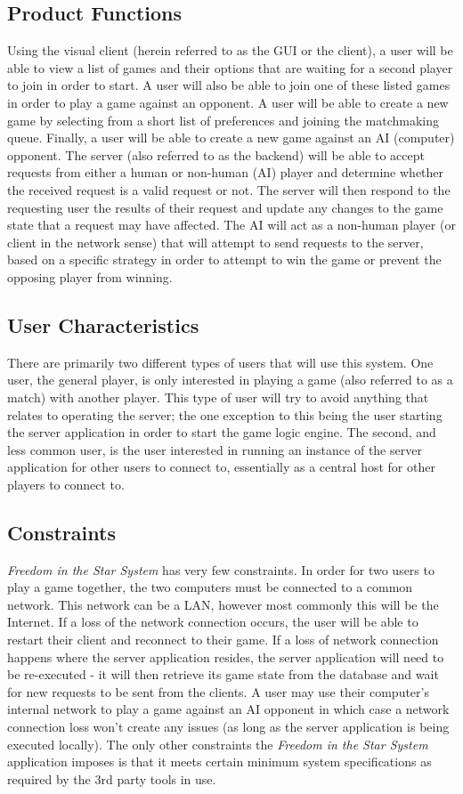 \documentclass[twoside,letterpaper]{article}
\begin{document}
\subsection{Product Functions}
Using the visual client (herein referred to as the GUI or the client), a user will be able to view a list of games and their options that are waiting for a second player to join in order to start.  A user will also be able to join one of these listed games in order to play a game against an opponent.  A user will be able to create a new game by selecting from a short list of preferences and joining the matchmaking queue.  Finally, a user will be able to create a new game against an AI (computer) opponent.  The server (also referred to as the backend) will be able to accept requests from either a human or non-human (AI) player and determine whether the received request is a valid request or not.  The server will then respond to the requesting user the results of their request and update any changes to the game state that a request may have affected.  The AI will act as a non-human player (or client in the network sense) that will attempt to send requests to the server, based on a specific strategy in order to attempt to win the game or prevent the opposing player from winning.

\subsection{User Characteristics}
There are primarily two different types of users that will use this system.  One user, the general player, is only interested in playing a game (also referred to as a match) with another player.  This type of user will try to avoid anything that relates to operating the server; the one exception to this being the user starting the server application in order to start the game logic engine.  The second, and less common user, is the user interested in running an instance of the server application for other users to connect to, essentially as a central host for other players to connect to.

\subsection{Constraints}
\textit{Freedom in the Star System} has very few constraints.  In order for two users to play a game together, the two computers must be connected to a common network.  This network can be a LAN, however most commonly this will be the Internet.  If a loss of the network connection occurs, the user will be able to restart their client and reconnect to their game.  If a loss of network connection happens where the server application resides, the server application will need to be re-executed - it will then retrieve its game state from the database and wait for new requests to be sent from the clients.  A user may use their computer's internal network to play a game against an AI opponent in which case a network connection loss won't create any issues (as long as the server application is being executed locally).  The only other constraints the \textit{Freedom in the Star System} application imposes is that it meets certain minimum system specifications as required by the 3rd party tools in use.
\end{document}
